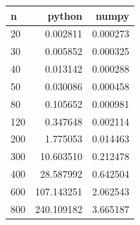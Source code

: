 \begin{tabular}{lrr}
\hline
n & python & numpy \\
\hline
20 & 0.002811 & 0.000273 \\
30 & 0.005852 & 0.000325 \\
40 & 0.013142 & 0.000288 \\
50 & 0.030086 & 0.000458 \\
80 & 0.105652 & 0.000981 \\
120 & 0.347648 & 0.002114 \\
200 & 1.775053 & 0.014463 \\
300 & 10.603510 & 0.212478 \\
400 & 28.587992 & 0.642504 \\
600 & 107.143251 & 2.062543 \\
800 & 240.109182 & 3.665187 \\
\hline
\end{tabular}

